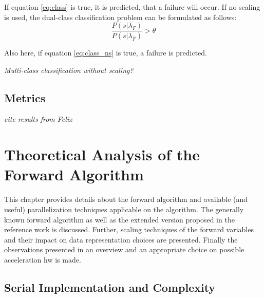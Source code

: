 \documentclass[mscthesis]{usiinfthesis}
\begin{document}
If equation \ref{eq:class} is true, it is predicted, that a failure will occur.
If no scaling is used, the dual-class classification problem can be formulated
as follows:
\begin{equation}
    \label{eq:class_ns}
    \frac{P(s|\lambda_F)}{P(s|\lambda_{\bar{F}})} > \theta
\end{equation}

Also here, if equation \ref{eq:class_ns} is true, a failure is predicted.

\emph{\color{red}Multi-class classification without scaling?}

\section{Metrics}
\label{ch:event_metrics}

\emph{\color{red}cite results from Felix}

\chapter{Theoretical Analysis of the Forward Algorithm}
\label{ch:analysis}
\glsresetall %

This chapter provides details about the forward algorithm and available (and
useful) parallelization techniques applicable on the algorithm. The generally
known forward algorithm as well as the extended version proposed in the
reference work is discussed. Further, scaling techniques of the forward
variables and their impact on data representation choices are presented.
Finally the observations presented in an overview and an appropriate choice on
possible acceleration \gls{hw} is made.

\section{Serial Implementation and Complexity}
\label{ch:analysis_serial}
\end{document}
